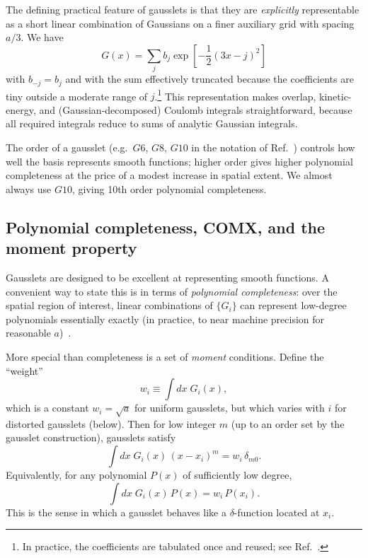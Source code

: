 \documentclass[aps,pra,reprint,longbibliography,nofootinbib]{revtex4-2}
\begin{document}
The defining practical feature of gausslets is that they are \emph{explicitly} representable as a
short linear combination of Gaussians on a finer auxiliary grid\cite{White17} with spacing $a/3$. We have
\begin{equation}
  G(x) = \sum_{j} b_j \exp\!\left[-\frac{1}{2}(3x-j)^2\right]
  \label{eq:gausslet_gaussian_sum}
\end{equation}
with $b_{-j}=b_j$ and with the sum effectively truncated because the coefficients are tiny outside a
moderate range of $j$.\footnote{In practice, the coefficients are tabulated once and reused; see
Ref.~\cite{White17}.}  This representation makes overlap, kinetic-energy, and (Gaussian-decomposed)
Coulomb integrals straightforward, because all required integrals reduce to sums of analytic Gaussian
integrals.

The order of a gausslet (e.g.\ $G6$, $G8$, $G10$ in the notation of Ref.~\cite{White17}) controls how
well the basis represents smooth functions; higher order gives higher polynomial completeness at the
price of a modest increase in spatial extent.  We almost always use $G10$, giving 10th order polynomial completeness.

\subsection{Polynomial completeness, COMX, and the moment property}

Gausslets are designed to be excellent at representing smooth functions.  A convenient way to state
this is in terms of \emph{polynomial completeness}: over the spatial region of interest, linear
combinations of $\{G_i\}$ can represent low-degree polynomials essentially exactly (in practice, to
near machine precision for reasonable $a$)~\cite{White17,White2023}.

More special than completeness is a set of \emph{moment} conditions.  Define the ``weight''
\begin{equation}
  w_i \equiv \int dx\; G_i(x),
  \label{eq:wi_def}
\end{equation}
which is a constant $w_i=\sqrt{a}$ for uniform gausslets, but which varies with $i$ for distorted gausslets (below).
Then for low integer $m$ (up to an order set by the gausslet construction), gausslets satisfy
\begin{equation}
  \int dx\; G_i(x)\,(x-x_i)^m = w_i\,\delta_{m0}.
  \label{eq:moments}
\end{equation}
Equivalently, for any polynomial $P(x)$ of sufficiently low degree,
\begin{equation}
  \int dx\; G_i(x)\,P(x) = w_i\,P(x_i).
  \label{eq:delta_property}
\end{equation}
This is the sense in which a gausslet behaves like a $\delta$-function located at $x_i$.
\end{document}
